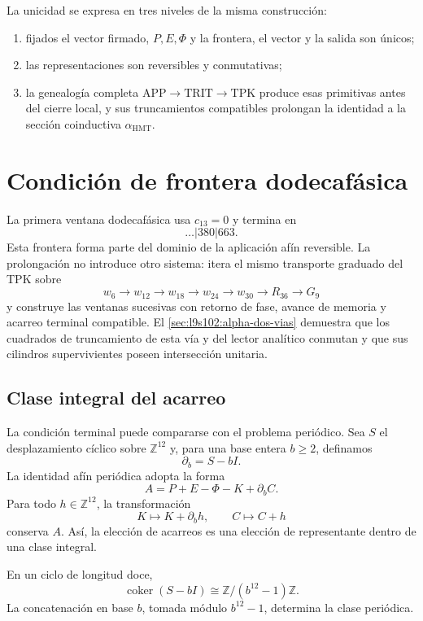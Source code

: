 La unicidad se expresa en tres niveles de la misma construcción:
\begin{enumerate}
  \item fijados el vector firmado, \(P,E,\Phi\) y la frontera, el vector y la
  salida son únicos;
  \item las representaciones son reversibles y conmutativas;
  \item la genealogía completa
  \(\mathrm{APP}\to\mathrm{TRIT}\to\mathrm{TPK}\) produce esas primitivas
  antes del cierre local, y sus truncamientos compatibles prolongan la
  identidad a la sección coinductiva \(\alpha_{\mathrm{HMT}}\).
\end{enumerate}

\section{Condición de frontera dodecafásica}

La primera ventana dodecafásica usa \(c_{13}=0\) y termina en
\[
\ldots|380|663.
\]
Esta frontera forma parte del dominio de la aplicación afín reversible. La
prolongación no introduce otro sistema: itera el mismo transporte graduado
del TPK sobre
\[
 w_6\to w_{12}\to w_{18}\to w_{24}\to w_{30}\to R_{36}\to G_9
\]
y construye las ventanas sucesivas con retorno de fase, avance de memoria y
acarreo terminal compatible. El
\cref{sec:l9s102:alpha-dos-vias} demuestra que los cuadrados de truncamiento
de esta vía y del lector analítico conmutan y que sus cilindros
supervivientes poseen intersección unitaria.

\subsection{Clase integral del acarreo}

La condición terminal puede compararse con el problema periódico. Sea
\(S\) el desplazamiento cíclico sobre \(\mathbb Z^{12}\) y, para una base
entera \(b\geq2\), definamos
\[
 \partial_b=S-bI.
\]
La identidad afín periódica adopta la forma
\[
 A=P+E-\Phi-K+\partial_bC.
\]
Para todo \(h\in\mathbb Z^{12}\), la transformación
\[
 K\longmapsto K+\partial_bh,
 \qquad
 C\longmapsto C+h
\]
conserva \(A\). Así, la elección de acarreos es una elección de
representante dentro de una clase integral.

\begin{proposition}
\label{prop:cociente-periodico-acarreo}
En un ciclo de longitud doce,
\[
 \operatorname{coker}(S-bI)\cong
 \mathbb Z/(b^{12}-1)\mathbb Z.
\]
La concatenación en base \(b\), tomada módulo \(b^{12}-1\), determina la
clase periódica.
\end{proposition}

